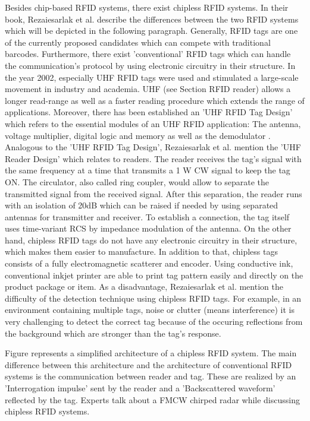 Besides chip-based RFID systems, there exist chipless RFID systems. In their book, Rezaiesarlak et al. \cite{chipless} describe the differences between the two RFID systems which will be depicted in the following paragraph.
Generally, RFID tags are one of the currently proposed candidates which can compete with traditional barcodes. Furthermore, there exist 'conventional' RFID tags which can handle the communication's protocol by using electronic circuitry in their structure. In the year 2002, especially UHF RFID tags were used and stimulated a large-scale movement in industry and academia. UHF (see Section RFID reader\pageref{reader}) allows a longer read-range as well as a faster reading procedure which extends the range of applications. Moreover, there has been established an 'UHF RFID Tag Design' which refers to the essential modules of an UHF RFID application: The antenna, voltage multiplier, digital logic and memory as well as the demodulator \cite[p.12 ff.]{chipless}. Analogous to the 'UHF RFID Tag Design',  Rezaiesarlak et al. mention the 'UHF Reader Design' which relates to readers. The reader receives the tag's signal with the same frequency at a time that transmits a 1 W \ac{CW} signal to keep the tag ON. The circulator, also called ring coupler, would allow to separate the transmitted signal from the received signal. After this separation, the reader runs with an isolation of 20dB which can be raised if needed by using separated antennas for transmitter and receiver. To establish a connection, the tag itself uses time-variant \ac{RCS} by impedance modulation of the antenna. 
On the other hand, chipless RFID tags do not have any electronic circuitry in their structure, which makes them easier to manufacture. In addition to that, chipless tags consists of a fully electromagnetic scatterer and encoder. Using conductive ink, conventional inkjet printer are able to print tag pattern easily and directly on the product package or item. As a disadvantage, Rezaiesarlak et al. \cite[p.12 ff.]{chipless} mention the difficulty of the detection technique using chipless RFID tags. For example, in an environment containing multiple tags, noise or clutter (means interference) it is very challenging to detect the correct tag because of the occuring reflections from the background which are stronger than the tag's response. 

Figure \pageref{fig:chipless_architecture} represents a simplified architecture of a chipless RFID system. The main difference between this architecture and the architecture of conventional RFID systems is the communication between reader and tag. These are realized by an 'Interrogation impulse' sent by the reader and a 'Backscattered waveform' reflected by the tag. Experts talk about a \ac{FMCW} chirped radar while discussing chipless RFID systems. 

